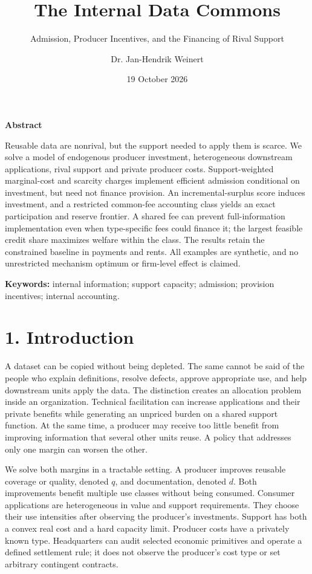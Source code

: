 \documentclass[
  11pt,
]{article}
\title{The Internal Data Commons}
\subtitle{Admission, Producer Incentives, and the Financing of Rival
Support}
\author{Dr. Jan-Hendrik Weinert}
\date{19 October 2026}
\makeatletter
\renewcommand{\maketitle}{%
  \begin{center}
  {\LARGE\bfseries\@title\par}
  \vspace{0.8em}
  {\normalsize\@author\par}
  \vspace{0.35em}
  {\small\@date\par}
  \end{center}
  \vspace{0.4em}}
\renewenvironment{abstract}{%
  \begin{center}\small\bfseries Abstract\end{center}
  \begin{list}{}{\setlength{\leftmargin}{0.5in}\setlength{\rightmargin}{0.5in}}
  \item[]\small\setlength{\parindent}{0pt}\ignorespaces
}{\end{list}\vspace{0.6em}}
\makeatother
\begin{document}
\maketitle
\begin{abstract}
Reusable data are nonrival, but the support needed to apply them is scarce. We solve a model of endogenous producer investment, heterogeneous downstream applications, rival support and private producer costs. Support-weighted marginal-cost and scarcity charges implement efficient admission conditional on investment, but need not finance provision. An incremental-surplus score induces investment, and a restricted common-fee accounting class yields an exact participation and reserve frontier. A shared fee can prevent full-information implementation even when type-specific fees could finance it; the largest feasible credit share maximizes welfare within the class. The results retain the constrained baseline in payments and rents. All examples are synthetic, and no unrestricted mechanism optimum or firm-level effect is claimed.
\end{abstract}
\noindent\small \textbf{Keywords:} internal information; support capacity; admission;
provision incentives; internal accounting.\par\normalsize
\vspace{0.6em}
\section{1. Introduction}\label{introduction}

A dataset can be copied without being depleted. The same cannot be said
of the people who explain definitions, resolve defects, approve
appropriate use, and help downstream units apply the data. The
distinction creates an allocation problem inside an organization.
Technical facilitation can increase applications and their private
benefits while generating an unpriced burden on a shared support
function. At the same time, a producer may receive too little benefit
from improving information that several other units reuse. A policy that
addresses only one margin can worsen the other.

We solve both margins in a tractable setting. A producer improves
reusable coverage or quality, denoted \(q\), and documentation, denoted
\(d\). Both improvements benefit multiple use classes without being
consumed. Consumer applications are heterogeneous in value and support
requirements. They choose their use intensities after observing the
producer's investments. Support has both a convex real cost and a hard
capacity limit. Producer costs have a privately known type. Headquarters
can audit selected economic primitives and operate a defined settlement
rule; it does not observe the producer's cost type or set arbitrary
contingent contracts.
\end{document}
